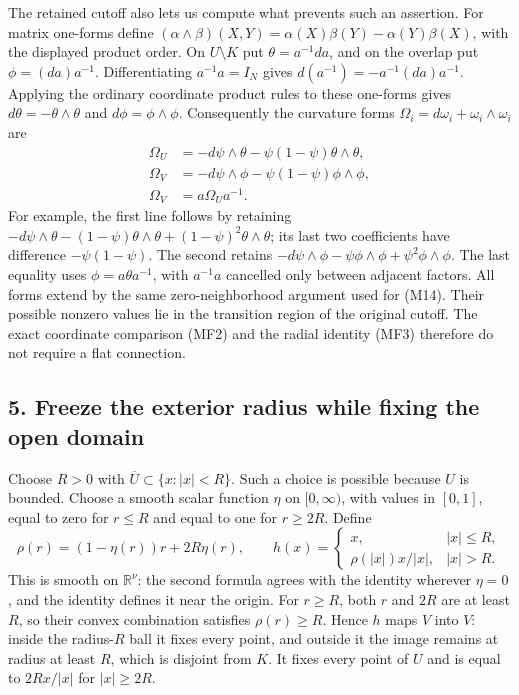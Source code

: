 \documentclass[
  11pt,
]{article}
\begin{document}
The retained cutoff also lets us compute what prevents such an
assertion. For matrix one-forms define
\((\alpha\wedge\beta)(X,Y)=\alpha(X)\beta(Y)-\alpha(Y)\beta(X)\), with
the displayed product order. On \(U\setminus K\) put
\(\theta=a^{-1}da\), and on the overlap put \(\phi=(da)a^{-1}\).
Differentiating \(a^{-1}a=I_N\) gives \(d(a^{-1})=-a^{-1}(da)a^{-1}\).
Applying the ordinary coordinate product rules to these one-forms gives
\(d\theta=-\theta\wedge\theta\) and \(d\phi=\phi\wedge\phi\).
Consequently the curvature forms
\(\Omega_i=d\omega_i+\omega_i\wedge\omega_i\) are \[
 \begin{aligned}
 \Omega_U&=-d\psi\wedge\theta
            -\psi(1-\psi)\theta\wedge\theta,\\
 \Omega_V&=-d\psi\wedge\phi
            -\psi(1-\psi)\phi\wedge\phi,\\
 \Omega_V&=a\Omega_Ua^{-1}.
 \end{aligned}
 \tag{MF4}
\] For example, the first line follows by retaining
\(-d\psi\wedge\theta-(1-\psi)\theta\wedge\theta
 +(1-\psi)^2\theta\wedge\theta\); its last two coefficients have
difference \(-\psi(1-\psi)\). The second retains
\(-d\psi\wedge\phi-\psi\phi\wedge\phi+\psi^2\phi\wedge\phi\). The last
equality uses \(\phi=a\theta a^{-1}\), with \(a^{-1}a\) cancelled only
between adjacent factors. All forms extend by the same zero-neighborhood
argument used for (M14). Their possible nonzero values lie in the
transition region of the original cutoff. The exact coordinate
comparison (MF2) and the radial identity (MF3) therefore do not require
a flat connection.

\subsection{5. Freeze the exterior radius while fixing the open
domain}\label{freeze-the-exterior-radius-while-fixing-the-open-domain}

Choose \(R>0\) with \(\overline U\subset\{x:|x|<R\}\). Such a choice is
possible because \(U\) is bounded. Choose a smooth scalar function
\(\eta\) on \([0,\infty)\), with values in \([0,1]\), equal to zero for
\(r\leq R\) and equal to one for \(r\geq2R\). Define \[
\rho(r)=(1-\eta(r))r+2R\eta(r),
\qquad
h(x)=
\begin{cases}
x,&|x|\leq R,\\
\rho(|x|)x/|x|,&|x|>R.
\end{cases}
\tag{M26}
\] This is smooth on \(\mathbb R^\nu\): the second formula agrees with
the identity wherever \(\eta=0\), and the identity defines it near the
origin. For \(r\geq R\), both \(r\) and \(2R\) are at least \(R\), so
their convex combination satisfies \(\rho(r)\geq R\). Hence \(h\) maps
\(V\) into \(V\): inside the radius-\(R\) ball it fixes every point, and
outside it the image remains at radius at least \(R\), which is disjoint
from \(K\). It fixes every point of \(U\) and is equal to \(2R x/|x|\)
for \(|x|\geq2R\).
\end{document}
